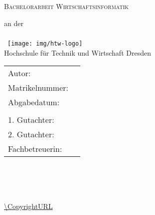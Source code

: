 \begin{titlepage}
\pagestyle{empty}

\hspace{1cm}\\
\,
\vspace{1cm}

\centering

	{
		\scshape
			\Huge \projektname{}
		\par
	}

\vspace{2cm}

{	\scshape	{\LARGE Bachelorarbeit Wirtschaftsinformatik} }

	\vspace{1mm}
	{		\small{an der}\\	}
	\hspace{1cm}\\
	\,
	\vspace{1em}
	{\texttt{[image: img/htw-logo]}
\\%
	{	\large	Hochschule für Technik und Wirtschaft Dresden\\ }
	}

\vfill
	\vspace{2em}


\begin{tabular}{ll}%
	Autor: & \Author{} \\
	Matrikelnummer: & \AuthorID{} \\
	Abgabedatum: & \DocDate{} \\
	& \\
	1. Gutachter: & \ReviewerA{} \\
	2. Gutachter: & \ReviewerB{} \\
	Fachbetreuerin: & \SupervisorA{} \\
	
\end{tabular}

\par

\newpage

\hspace{1cm}\\
\,
\vspace{1cm}

\par

\vspace{1em}

\par



\vfill

\centering


\CopyrightIMG{}

\Copyright{}\\
\url{\CopyrightURL}

\RepoURL{}
\newpage

\end{titlepage}

